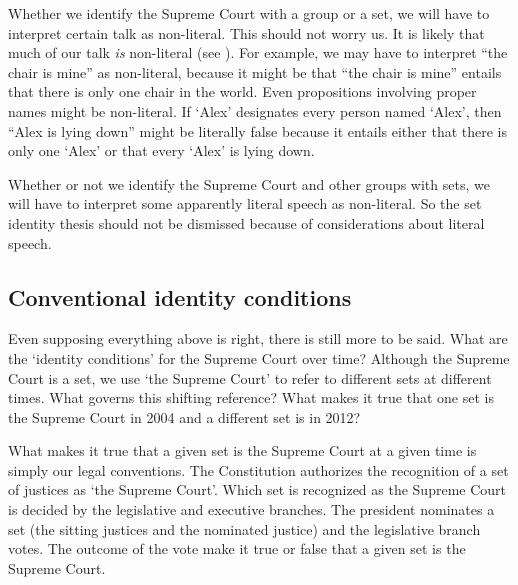 \documentclass[11pt]{article}
\begin{document}
\begin{spacing}{1.5}
Whether we identify the Supreme Court with a group or a set, we will
have to interpret certain talk as non-literal.  This should not worry
us.  It is likely that much of our talk {\em is} non-literal (see
\citet{bach1987}).  For example, we may have to interpret ``the chair
is mine'' as non-literal, because it might be that ``the chair is
mine'' entails that there is only one chair in the world.  Even
propositions involving proper names might be non-literal.  If `Alex'
designates every person named `Alex', then ``Alex is lying down''
might be literally false because it entails either that there is only
one `Alex' or that every `Alex' is lying down.

Whether or not we identify the Supreme Court and other groups with
sets, we will have to interpret some apparently literal speech as
non-literal.  So the set identity thesis should not be dismissed
because of considerations about literal speech.


\subsection{Conventional identity conditions}
\label{set-convention}
Even supposing everything above is right, there is still more to be
said.  What are the `identity conditions' for the Supreme Court over
time?  Although the Supreme Court is a set, we use `the Supreme Court'
to refer to different sets at different times.  What governs this
shifting reference?  What makes it true that one set is the Supreme
Court in 2004 and a different set is in 2012?

What makes it true that a given set is the Supreme Court at a given
time is simply our legal conventions.  The Constitution authorizes the
recognition of a set of justices as `the Supreme Court'.  Which set is
recognized as the Supreme Court is decided by the legislative and
executive branches.  The president nominates a set (the sitting
justices and the nominated justice) and the legislative branch votes.
The outcome of the vote make it true or false that a given set is the
Supreme Court.


\end{spacing}
\end{document}
